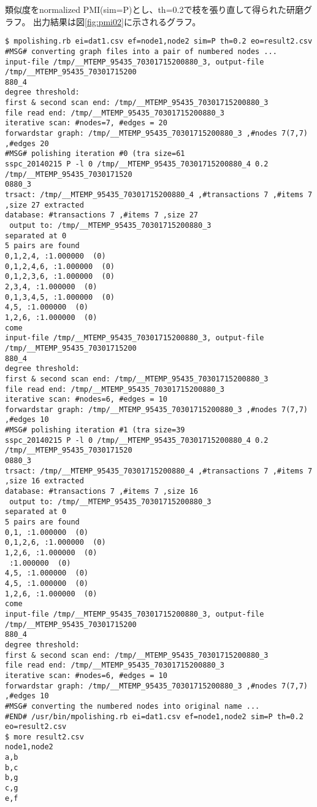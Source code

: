 類似度をnormalized PMI(sim=P)とし、th=0.2で枝を張り直して得られた研磨グラフ。
出力結果は図\ref{fig:pmi02}に示されるグラフ。



\begin{Verbatim}[baselinestretch=0.7,frame=single]
$ mpolishing.rb ei=dat1.csv ef=node1,node2 sim=P th=0.2 eo=result2.csv
#MSG# converting graph files into a pair of numbered nodes ...
input-file /tmp/__MTEMP_95435_70301715200880_3, output-file /tmp/__MTEMP_95435_70301715200
880_4
degree threshold: 
first & second scan end: /tmp/__MTEMP_95435_70301715200880_3
file read end: /tmp/__MTEMP_95435_70301715200880_3
iterative scan: #nodes=7, #edges = 20
forwardstar graph: /tmp/__MTEMP_95435_70301715200880_3 ,#nodes 7(7,7) ,#edges 20
#MSG# polishing iteration #0 (tra size=61
sspc_20140215 P -l 0 /tmp/__MTEMP_95435_70301715200880_4 0.2 /tmp/__MTEMP_95435_7030171520
0880_3
trsact: /tmp/__MTEMP_95435_70301715200880_4 ,#transactions 7 ,#items 7 ,size 27 extracted 
database: #transactions 7 ,#items 7 ,size 27
 output to: /tmp/__MTEMP_95435_70301715200880_3
separated at 0
5 pairs are found
0,1,2,4, :1.000000  (0)
0,1,2,4,6, :1.000000  (0)
0,1,2,3,6, :1.000000  (0)
2,3,4, :1.000000  (0)
0,1,3,4,5, :1.000000  (0)
4,5, :1.000000  (0)
1,2,6, :1.000000  (0)
come
input-file /tmp/__MTEMP_95435_70301715200880_3, output-file /tmp/__MTEMP_95435_70301715200
880_4
degree threshold: 
first & second scan end: /tmp/__MTEMP_95435_70301715200880_3
file read end: /tmp/__MTEMP_95435_70301715200880_3
iterative scan: #nodes=6, #edges = 10
forwardstar graph: /tmp/__MTEMP_95435_70301715200880_3 ,#nodes 7(7,7) ,#edges 10
#MSG# polishing iteration #1 (tra size=39
sspc_20140215 P -l 0 /tmp/__MTEMP_95435_70301715200880_4 0.2 /tmp/__MTEMP_95435_7030171520
0880_3
trsact: /tmp/__MTEMP_95435_70301715200880_4 ,#transactions 7 ,#items 7 ,size 16 extracted 
database: #transactions 7 ,#items 7 ,size 16
 output to: /tmp/__MTEMP_95435_70301715200880_3
separated at 0
5 pairs are found
0,1, :1.000000  (0)
0,1,2,6, :1.000000  (0)
1,2,6, :1.000000  (0)
 :1.000000  (0)
4,5, :1.000000  (0)
4,5, :1.000000  (0)
1,2,6, :1.000000  (0)
come
input-file /tmp/__MTEMP_95435_70301715200880_3, output-file /tmp/__MTEMP_95435_70301715200
880_4
degree threshold: 
first & second scan end: /tmp/__MTEMP_95435_70301715200880_3
file read end: /tmp/__MTEMP_95435_70301715200880_3
iterative scan: #nodes=6, #edges = 10
forwardstar graph: /tmp/__MTEMP_95435_70301715200880_3 ,#nodes 7(7,7) ,#edges 10
#MSG# converting the numbered nodes into original name ...
#END# /usr/bin/mpolishing.rb ei=dat1.csv ef=node1,node2 sim=P th=0.2 eo=result2.csv
$ more result2.csv
node1,node2
a,b
b,c
b,g
c,g
e,f
\end{Verbatim}
